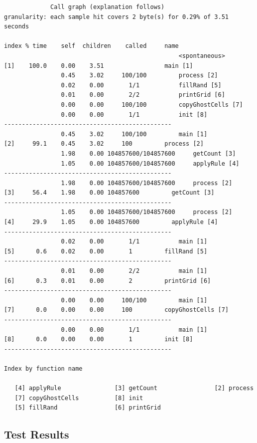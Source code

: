 \documentclass[11pt]{article} %
\begin{document}
\begin{verbatim}
		     Call graph (explanation follows)
granularity: each sample hit covers 2 byte(s) for 0.29% of 3.51 seconds

index % time    self  children    called     name
                                                 <spontaneous>
[1]    100.0    0.00    3.51                 main [1]
                0.45    3.02     100/100         process [2]
                0.02    0.00       1/1           fillRand [5]
                0.01    0.00       2/2           printGrid [6]
                0.00    0.00     100/100         copyGhostCells [7]
                0.00    0.00       1/1           init [8]
-----------------------------------------------
                0.45    3.02     100/100         main [1]
[2]     99.1    0.45    3.02     100         process [2]
                1.98    0.00 104857600/104857600     getCount [3]
                1.05    0.00 104857600/104857600     applyRule [4]
-----------------------------------------------
                1.98    0.00 104857600/104857600     process [2]
[3]     56.4    1.98    0.00 104857600         getCount [3]
-----------------------------------------------
                1.05    0.00 104857600/104857600     process [2]
[4]     29.9    1.05    0.00 104857600         applyRule [4]
-----------------------------------------------
                0.02    0.00       1/1           main [1]
[5]      0.6    0.02    0.00       1         fillRand [5]
-----------------------------------------------
                0.01    0.00       2/2           main [1]
[6]      0.3    0.01    0.00       2         printGrid [6]
-----------------------------------------------
                0.00    0.00     100/100         main [1]
[7]      0.0    0.00    0.00     100         copyGhostCells [7]
-----------------------------------------------
                0.00    0.00       1/1           main [1]
[8]      0.0    0.00    0.00       1         init [8]
-----------------------------------------------

Index by function name

   [4] applyRule               [3] getCount                [2] process
   [7] copyGhostCells          [8] init
   [5] fillRand                [6] printGrid

\end{verbatim}
\endgroup
\subsection*{Test Results}
\end{document}
